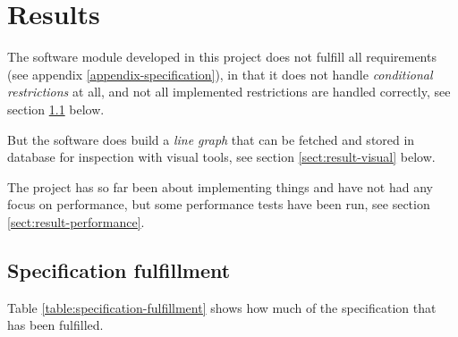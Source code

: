 \documentclass[../main.tex]{subfiles}
\begin{document}
\chapter{Results}
The software module developed in this project does not fulfill all requirements (see appendix \ref{appendix-specification}), in that it does not handle \textit{conditional restrictions} at all, and not all implemented restrictions are handled correctly, see section \ref{sect:result-specification} below.

But the software does build a \textit{line graph} that can be fetched and stored in database for inspection with visual tools, see section \ref{sect:result-visual} below.

The project has so far been about implementing things and have not had any focus on performance, but some performance tests have been run, see section \ref{sect:result-performance}.

\section{Specification fulfillment}\label{sect:result-specification}
Table \ref{table:specification-fulfillment} shows how much of the specification that has been fulfilled.
\end{document}
